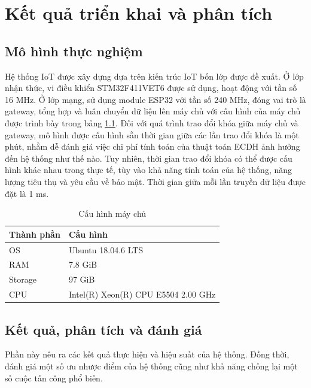 \chapter{Kết quả triển khai và phân tích}
\label{Chapter4}

\section{Mô hình thực nghiệm}
Hệ thống IoT được xây dựng dựa trên kiến trúc IoT bốn lớp được đề xuất. Ở lớp nhận thức, vi điều khiển STM32F411VET6 được sử dụng, hoạt động với tần số 16 MHz. Ở lớp mạng, sử dụng module ESP32 với tần số 240 MHz, đóng vai trò là gateway, tổng hợp và luân chuyển dữ liệu lên máy chủ với cấu hình của máy chủ được trình bày trong bảng \ref{tab:server-config}. Đối với quá trình trao đổi khóa giữa máy chủ và gateway, mô hình được cấu hình sẵn thời gian giữa các lần trao đổi khóa là một phút, nhằm dễ đánh giá việc chi phí tính toán của thuật toán ECDH ảnh hưởng đến hệ thống như thế nào. Tuy nhiên, thời gian trao đổi khóa có thể được cấu hình khác nhau trong thực tế, tùy vào khả năng tính toán của hệ thống, năng lượng tiêu thụ và yêu cầu về bảo mật. Thời gian giữa mỗi lần truyền dữ liệu được đặt là 1 ms.

\begin{table}[ht]
\centering
\small
\caption{Cấu hình máy chủ}
\label{tab:server-config}
\renewcommand{\arraystretch}{1.2} %
\begin{tabular}{|p{3cm}|p{10cm}|}
\hline
\textbf{Thành phần} & \textbf{Cấu hình} \\
\hline
OS      & Ubuntu 18.04.6 LTS \\
RAM     & 7.8 GiB \\
Storage & 97 GiB \\
CPU     & Intel(R) Xeon(R) CPU E5504 2.00 GHz \\
\hline
\end{tabular}
\end{table}

\section{Kết quả, phân tích và đánh giá}
Phần này nêu ra các kết quả thực hiện và hiệu suất của hệ thống. Đồng thời, đánh giá một số ưu nhược điểm của hệ thống cũng như khả năng chống lại một số cuộc tấn công phổ biến.
